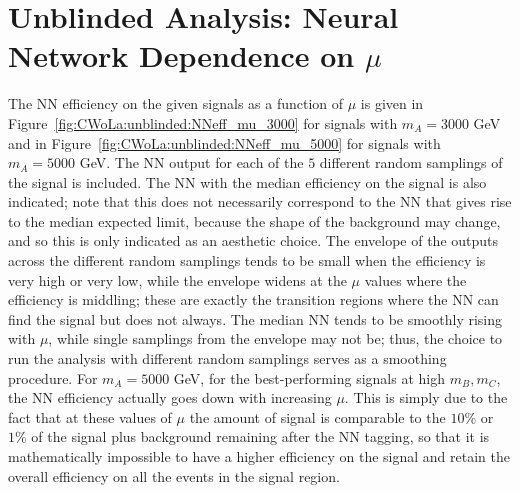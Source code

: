 \FloatBarrier
\section{Unblinded Analysis: Neural Network Dependence on $\mu$}
\label{app:CWoLa:unblinded:NNeff_mu}
The NN efficiency on the given signals as a function of $\mu$ is given in Figure~\ref{fig:CWoLa:unblinded:NNeff_mu_3000} for signals with $m_A=3000$ GeV and in Figure~\ref{fig:CWoLa:unblinded:NNeff_mu_5000} for signals with $m_A=5000$ GeV.
The NN output for each of the $5$ different random samplings of the signal is included.
The NN with the median efficiency on the signal is also indicated; note that this does not necessarily correspond to the NN that gives rise to the median expected limit, because the shape of the background may change, and so this is only indicated as an aesthetic choice.
The envelope of the outputs across the different random samplings tends to be small when the efficiency is very high or very low, while the envelope widens at the $\mu$ values where the efficiency is middling; these are exactly the transition regions where the NN can find the signal but does not always.
The median NN tends to be smoothly rising with $\mu$, while single samplings from the envelope may not be; thus, the choice to run the analysis with different random samplings serves as a smoothing procedure.
For $m_A=5000$ GeV, for the best-performing signals at high $m_B,m_C$, the NN efficiency actually goes down with increasing $\mu$.
This is simply due to the fact that at these values of $\mu$ the amount of signal is comparable to the $10\%$ or $1\%$ of the signal plus background remaining after the NN tagging, so that it is mathematically impossible to have a higher efficiency on the signal and retain the overall efficiency on all the events in the signal region.

